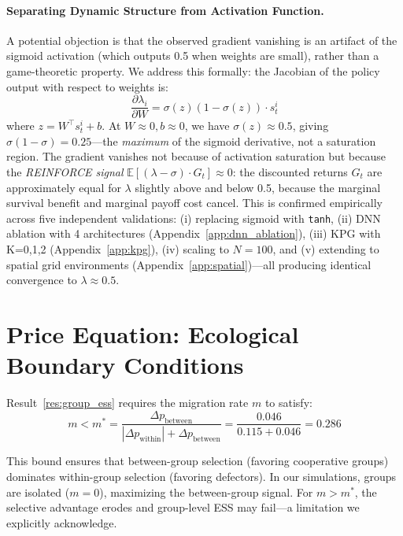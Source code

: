 \documentclass{article}
\begin{document}
\paragraph{Separating Dynamic Structure from Activation Function.}
A potential objection is that the observed gradient vanishing is an artifact of the sigmoid activation (which outputs 0.5 when weights are small), rather than a game-theoretic property.
We address this formally: the Jacobian of the policy output with respect to weights is:
\begin{equation}
\frac{\partial \lambda_i}{\partial W} = \sigma(z)(1-\sigma(z)) \cdot s_t^i
\end{equation}
where $z = W^\top s_t^i + b$.
At $W \approx 0, b \approx 0$, we have $\sigma(z) \approx 0.5$, giving $\sigma(1-\sigma) = 0.25$---the \emph{maximum} of the sigmoid derivative, not a saturation region.
The gradient vanishes not because of activation saturation but because the \emph{REINFORCE signal} $\mathbb{E}[(\lambda - \sigma) \cdot G_t] \approx 0$: the discounted returns $G_t$ are approximately equal for $\lambda$ slightly above and below 0.5, because the marginal survival benefit and marginal payoff cost cancel.
This is confirmed empirically across five independent validations: (i) replacing sigmoid with \texttt{tanh}, (ii) DNN ablation with 4 architectures (Appendix~\ref{app:dnn_ablation}), (iii) KPG with K=0,1,2 (Appendix~\ref{app:kpg}), (iv) scaling to $N=100$, and (v) extending to spatial grid environments (Appendix~\ref{app:spatial})---all producing identical convergence to $\lambda \approx 0.5$.

\section{Price Equation: Ecological Boundary Conditions}
\label{app:price}

Result~\ref{res:group_ess} requires the migration rate $m$ to satisfy:
\begin{equation}
m < m^* = \frac{\Delta p_{\text{between}}}{|\Delta p_{\text{within}}| + \Delta p_{\text{between}}} = \frac{0.046}{0.115 + 0.046} = 0.286
\end{equation}

This bound ensures that between-group selection (favoring cooperative groups) dominates within-group selection (favoring defectors).
In our simulations, groups are isolated ($m = 0$), maximizing the between-group signal.
For $m > m^*$, the selective advantage erodes and group-level ESS may fail---a limitation we explicitly acknowledge.
\end{document}
